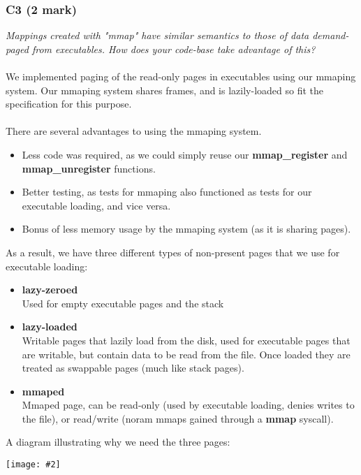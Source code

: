 \documentclass{report}
\newcommand{\question}[1]{\textit{#1} \ }
\newcommand{\bullpara}[2]{\item \textbf{#1} \ #2}
\newcommand{\fun}[1]{\textcolor{Emerald}{\textbf{#1}}}
\newcommand{\centerimage}[2]{\begin{center}
	\texttt{[image: \#2]}
\end{center}}
\newcommand{\compitem}[1]{\begin{itemize}\setlength\itemsep{-0.1em}#1\end{itemize}}
\begin{document}
			\subsubsection*{C3 (2 mark)}
				\question{Mappings created with "mmap" have similar semantics to those of 
				data demand-paged from executables. How does your code-base take advantage 
				of this?}
				\\
				\\ We implemented paging of the read-only pages in executables using our mmaping system.
				Our mmaping system shares frames, and is lazily-loaded so fit the specification for this purpose.
				\\
				\\ There are several advantages to using the mmaping system.
				\compitem{
					\item Less code was required, as we could simply reuse our \fun{mmap\_register} and \fun{mmap\_unregister} functions.
					\item Better testing, as tests for mmaping also functioned as tests for our executable loading, and vice versa.
					\item Bonus of less memory usage by the mmaping system (as it is sharing pages).
				}
				As a result, we have three different types of non-present pages
				that we use for executable loading:
				\compitem{
					\bullpara{lazy-zeroed}{
						\\Used for empty executable pages and the stack}
					\bullpara{lazy-loaded}{
						\\Writable pages that lazily load from the disk, used for 
						executable pages that are writable, but contain data to be
						read from the file. Once loaded they are treated as swappable
						pages (much like stack pages).}
					\bullpara{mmaped}{
						\\Mmaped page, can be read-only (used by executable loading,
						denies writes to the file), or read/write (noram mmaps
						gained through a \fun{mmap} syscall).}
				}

				\begin{minipage}{\textwidth}
					A diagram illustrating why we need the three pages:
					\centerimage{width=\textwidth}{executable load.png}
				\end{minipage}
				
\end{document}

